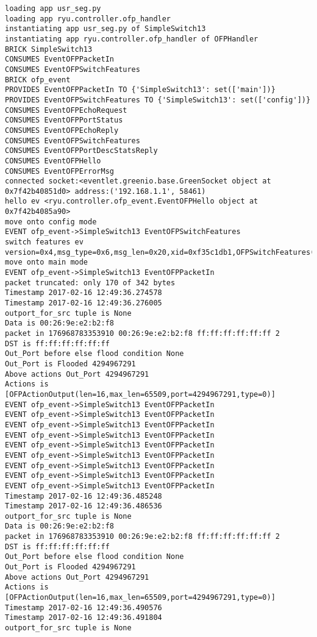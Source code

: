 \begin{lstlisting}[frame=single, caption={The RYU Verbose log}, label={lst:RYUverboselog}]
loading app usr_seg.py
loading app ryu.controller.ofp_handler
instantiating app usr_seg.py of SimpleSwitch13
instantiating app ryu.controller.ofp_handler of OFPHandler
BRICK SimpleSwitch13
CONSUMES EventOFPPacketIn
CONSUMES EventOFPSwitchFeatures
BRICK ofp_event
PROVIDES EventOFPPacketIn TO {'SimpleSwitch13': set(['main'])}
PROVIDES EventOFPSwitchFeatures TO {'SimpleSwitch13': set(['config'])}
CONSUMES EventOFPEchoRequest
CONSUMES EventOFPPortStatus
CONSUMES EventOFPEchoReply
CONSUMES EventOFPSwitchFeatures
CONSUMES EventOFPPortDescStatsReply
CONSUMES EventOFPHello
CONSUMES EventOFPErrorMsg
connected socket:<eventlet.greenio.base.GreenSocket object at 0x7f42b40851d0> address:('192.168.1.1', 58461)
hello ev <ryu.controller.ofp_event.EventOFPHello object at 0x7f42b4085a90>
move onto config mode
EVENT ofp_event->SimpleSwitch13 EventOFPSwitchFeatures
switch features ev version=0x4,msg_type=0x6,msg_len=0x20,xid=0xf35c1db1,OFPSwitchFeatures(auxiliary_id=0,capabilities=79,datapath_id=176968783353910,n_buffers=256,n_tables=254)
move onto main mode
EVENT ofp_event->SimpleSwitch13 EventOFPPacketIn
packet truncated: only 170 of 342 bytes
Timestamp 2017-02-16 12:49:36.274578
Timestamp 2017-02-16 12:49:36.276005
outport_for_src tuple is None
Data is 00:26:9e:e2:b2:f8
packet in 176968783353910 00:26:9e:e2:b2:f8 ff:ff:ff:ff:ff:ff 2
DST is ff:ff:ff:ff:ff:ff
Out_Port before else flood condition None
Out_Port is Flooded 4294967291
Above actions Out_Port 4294967291
Actions is [OFPActionOutput(len=16,max_len=65509,port=4294967291,type=0)]
EVENT ofp_event->SimpleSwitch13 EventOFPPacketIn
EVENT ofp_event->SimpleSwitch13 EventOFPPacketIn
EVENT ofp_event->SimpleSwitch13 EventOFPPacketIn
EVENT ofp_event->SimpleSwitch13 EventOFPPacketIn
EVENT ofp_event->SimpleSwitch13 EventOFPPacketIn
EVENT ofp_event->SimpleSwitch13 EventOFPPacketIn
EVENT ofp_event->SimpleSwitch13 EventOFPPacketIn
EVENT ofp_event->SimpleSwitch13 EventOFPPacketIn
EVENT ofp_event->SimpleSwitch13 EventOFPPacketIn
Timestamp 2017-02-16 12:49:36.485248
Timestamp 2017-02-16 12:49:36.486536
outport_for_src tuple is None
Data is 00:26:9e:e2:b2:f8
packet in 176968783353910 00:26:9e:e2:b2:f8 ff:ff:ff:ff:ff:ff 2
DST is ff:ff:ff:ff:ff:ff
Out_Port before else flood condition None
Out_Port is Flooded 4294967291
Above actions Out_Port 4294967291
Actions is [OFPActionOutput(len=16,max_len=65509,port=4294967291,type=0)]
Timestamp 2017-02-16 12:49:36.490576
Timestamp 2017-02-16 12:49:36.491804
outport_for_src tuple is None

\end{lstlisting}
